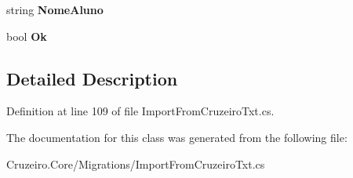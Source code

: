 \begin{DoxyCompactItemize}
\item 
string {\bfseries Nome\+Aluno}\hypertarget{class_cruzeiro_1_1_core_1_1_migrations_1_1_import_from_cruzeiro_txt_1_1_entrada_acedfb906efe15287c66c04151c74f0e4}{}\label{class_cruzeiro_1_1_core_1_1_migrations_1_1_import_from_cruzeiro_txt_1_1_entrada_acedfb906efe15287c66c04151c74f0e4}

\item 
bool {\bfseries Ok}\hypertarget{class_cruzeiro_1_1_core_1_1_migrations_1_1_import_from_cruzeiro_txt_1_1_entrada_a6829b49295ddd24525430f5e514b6354}{}\label{class_cruzeiro_1_1_core_1_1_migrations_1_1_import_from_cruzeiro_txt_1_1_entrada_a6829b49295ddd24525430f5e514b6354}

\end{DoxyCompactItemize}


\subsection{Detailed Description}


Definition at line 109 of file Import\+From\+Cruzeiro\+Txt.\+cs.



The documentation for this class was generated from the following file\+:\begin{DoxyCompactItemize}
\item 
Cruzeiro.\+Core/\+Migrations/Import\+From\+Cruzeiro\+Txt.\+cs\end{DoxyCompactItemize}
